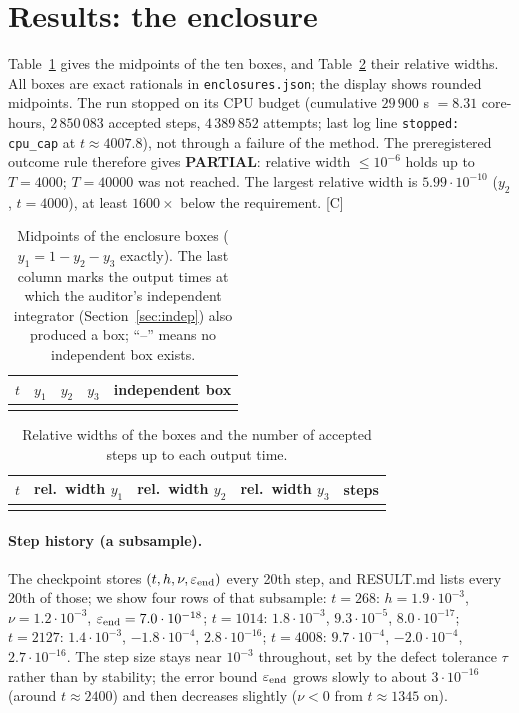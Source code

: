 \documentclass[11pt]{article}
\newcommand{\tier}[1]{\textsf{[#1]}}
\newcommand{\tC}{\tier{C}}
\theoremstyle{remark}
\begin{document}
\section{Results: the enclosure}\label{sec:res}
Table~\ref{tab:encl} gives the midpoints of the ten boxes, and Table~\ref{tab:width} their relative widths. All boxes are exact rationals in \texttt{enclosures.json}; the display shows rounded midpoints. The run stopped on its CPU budget (cumulative $29\,900$ s $=8.31$ core-hours, $2\,850\,083$ accepted steps, $4\,389\,852$ attempts; last log line \texttt{stopped: cpu\_cap} at $t\approx4007.8$), not through a failure of the method. The preregistered outcome rule therefore gives \textbf{PARTIAL}: relative width $\le10^{-6}$ holds up to $T=4000$; $T=40000$ was not reached. The largest relative width is $5.99\cdot10^{-10}$ ($y_2$, $t=4000$), at least $1600\times$ below the requirement. \tC{}

\begin{table}[ht]\centering\small
\caption{Midpoints of the enclosure boxes ($y_1=1-y_2-y_3$ exactly). The last column marks the output times at which the auditor's independent integrator (Section~\ref{sec:indep}) also produced a box; ``--'' means no independent box exists.}\label{tab:encl}
\begin{tabular}{rrrrc}\toprule
$t$ & $y_1$ & $y_2$ & $y_3$ & independent box\\\midrule
\\
\bottomrule
\end{tabular}
\end{table}

\begin{table}[ht]\centering\small
\caption{Relative widths of the boxes and the number of accepted steps up to each output time.}\label{tab:width}
\begin{tabular}{rcccr}\toprule
$t$ & rel.\ width $y_1$ & rel.\ width $y_2$ & rel.\ width $y_3$ & steps\\\midrule
\\
\bottomrule
\end{tabular}
\end{table}

\paragraph{Step history (a subsample).} The checkpoint stores $(t,h,\nu,\varepsilon_{\rm end})$ every 20th step, and RESULT.md lists every 20th of those; we show four rows of that subsample: $t=268$: $h=1.9\cdot10^{-3}$, $\nu=1.2\cdot10^{-3}$, $\varepsilon_{\rm end}=7.0\cdot10^{-18}$; $t=1014$: $1.8\cdot10^{-3}$, $9.3\cdot10^{-5}$, $8.0\cdot10^{-17}$; $t=2127$: $1.4\cdot10^{-3}$, $-1.8\cdot10^{-4}$, $2.8\cdot10^{-16}$; $t=4008$: $9.7\cdot10^{-4}$, $-2.0\cdot10^{-4}$, $2.7\cdot10^{-16}$. The step size stays near $10^{-3}$ throughout, set by the defect tolerance $\tau$ rather than by stability; the error bound $\varepsilon_{\rm end}$ grows slowly to about $3\cdot10^{-16}$ (around $t\approx2400$) and then decreases slightly ($\nu<0$ from $t\approx1345$ on).
\end{document}
